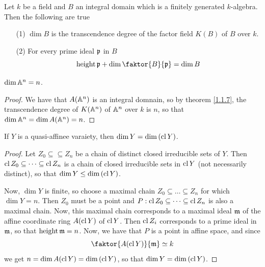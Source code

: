 \begin{theorem}\label{1.1.7}
    Let $k$ be a field and  $B$ an integral domain which is a finitely generated
     $k$-algebra. Then the following are true
     \begin{enumerate}
         \item[(1)] $\dim{B}$ is the transcendence degree of the factor field
             $K(B)$ of $B$ over  $k$.

         \item[(2)] For every prime ideal $\mathfrak{p}$ in  $B$
             \begin{equation*}
                 \height{\pf}+\dim{\faktor{B}{\pf}}=\dim{B}
             \end{equation*}
     \end{enumerate}
\end{theorem}

\begin{lemma}\label{1.1.8}
    $\dim{\mathbb{A}^n}=n$.
\end{lemma}
\begin{proof}
    We have that $A(\mathbb{A}^n)$ is an integral domnain, so by theorem \ref{1.1.7}, the
    transcendence degree of $K(\mathbb{A}^n)$ of $\mathbb{A}^n$ over $k$ is $n$, so that
    $\dim{\mathbb{A}^n}=\dim{A(\mathbb{A}^n)}=n$.
\end{proof}

\begin{lemma}\label{1.1.9}
    If $Y$ is a quasi-affinee varaiety, then  $\dim{Y=\dim{(\operatorname{cl}{Y})}}$.
\end{lemma}
\begin{proof}
    Let $Z_0 \subseteq \subseteq Z_n$ be a chain of distinct closed irreducible
    sets of $Y$. Then  $\operatorname{cl}{Z_0} \subseteq \dots \subseteq \operatorname{cl}{Z_n}$ is a chain
    of closed irreducible sets in $\operatorname{cl}{Y}$ (not necessarily distinct), so that
    $\dim{Y} \leq \dim{(\operatorname{cl}{Y})}$.

    Now, $\dim{Y}$ is finite, so choose a maximal chain $Z_0 \subseteq \dots
    \subseteq Z_n$ for which $\dim{Y}=n$. Then $Z_0$ must be a point and
    $P:\operatorname{cl}{Z_0} \subseteq \dots \subseteq \operatorname{cl}{Z_n}$ is also a maximal chain. Now,
    this maximal chain corresponds to a maximal ideal $\mathfrak{m}$ of the affine
    coordinate ring  $A(\operatorname{cl}{Y})$ of $\operatorname{cl}{Y}$. Then $\operatorname{cl}{Z_i}$ corresponds to a
    prime ideal in $\mathfrak{m}$, so that  $\operatorname{height}{\mathfrak{m}}=n$. Now, we have that $P$ is a
    point in affine space, and since
    \begin{equation*}
        \faktor{A(\cl{Y})}{\mf} \simeq k
    \end{equation*}
    we get $n=\dim{A(\operatorname{cl}{Y})}=\dim{(\operatorname{cl}{Y})}$, so that $\dim{Y}=\dim{(\operatorname{cl}{Y})}$.
\end{proof}


